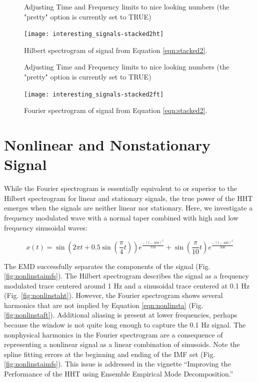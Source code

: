 \documentclass[12pt]{article}
\begin{document}
\begin{figure}[ht]
\begin{center}
\begin{Schunk}
\begin{Soutput}
Adjusting Time and Frequency limits to nice looking numbers (the "pretty" option is currently set to TRUE)
\end{Soutput}
\end{Schunk}
\texttt{[image: interesting\_signals-stacked2ht]}
\end{center}
\caption{Hilbert spectrogram of signal from Equation \ref{eqn:stacked2}.}
\label{fig:stacked2ht}
\end{figure}

\begin{figure}[ht]
\begin{center}
\begin{Schunk}
\begin{Soutput}
Adjusting Time and Frequency limits to nice looking numbers (the "pretty" option is currently set to TRUE)
\end{Soutput}
\end{Schunk}
\texttt{[image: interesting\_signals-stacked2ft]}
\end{center}
\caption{Fourier spectrogram of signal from Equation \ref{eqn:stacked2}.}
\label{fig:stacked2ft}
\end{figure}

\FloatBarrier

\section{Nonlinear and Nonstationary Signal}
While the Fourier spectrogram is essentially equivalent to or superior to the Hilbert spectrogram for linear and stationary signals,
the true power of the HHT emerges when the signals are neither linear nor stationary.
Here, we investigate a frequency modulated wave with a normal taper combined with high and low frequency sinusoidal waves:

\begin{equation}
\label{eqn:nonlinsta}
x (t) = \sin(2\pi t+0.5\sin(\frac{\pi}{4} t))e^{\frac{-(t-100)^{2}}{750}} + \sin(\frac{\pi}{10} t)e^{\frac{-(t-100)^{2}}{500}}
\end{equation}

The EMD successfully separates the components of the signal (Fig. \ref{fig:nonlinstaimfs}).
The Hilbert spectrogram describes the signal as a frequency modulated trace centered around 1 Hz and a 
sinusoidal trace centered at 0.1 Hz (Fig. \ref{fig:nonlinstaht}).
However, the Fourier spectrogram shows several harmonics that are not implied by Equation \ref{eqn:nonlinsta} (Fig. \ref{fig:nonlinstaft}).
Additional aliasing is present at lower frequencies, perhaps because the window is not quite long enough to capture the 0.1 Hz signal.
The nonphysical harmonics in the Fourier spectrogram are a consequence of representing a nonlinear signal as a linear combination of sinusoids.
Note the spline fitting errors at the beginning and ending of the IMF set (Fig. \ref{fig:nonlinstaimfs}).
This issue is addressed in the vignette ``Improving the Performance of the HHT using Ensemble Empirical Mode Decomposition.''
\end{document}
